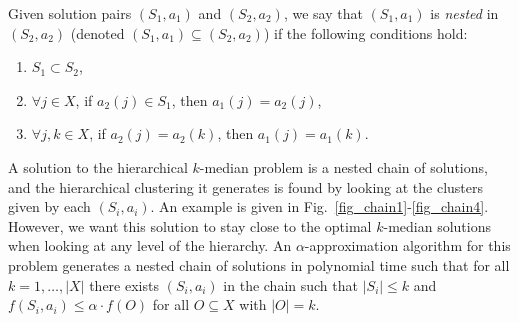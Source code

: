\documentclass[conference, 10pt, final]{IEEEtran}
\begin{document}
Given solution pairs $(S_1, a_1)$ and $(S_2, a_2)$, we say that $(S_1, a_1)$ is \emph{nested} in $(S_2, a_2)$ (denoted $(S_1, a_1) \subseteq (S_2, a_2)$) if the following conditions hold:
\begin{enumerate}[\IEEEsetlabelwidth{3)}]
	\item $S_1 \subset S_2$, 
	\item $\forall  j \in X$, if $a_2(j) \in S_1$, then $a_1(j) = a_2(j)$, 
	\item $\forall j, k \in X$, if $a_2(j) = a_2(k)$, then $a_1(j) = a_1(k)$.
\end{enumerate}
A solution to the hierarchical $k$-median problem is a nested chain of solutions, and the hierarchical clustering it generates is found by looking at the clusters given by each $(S_i, a_i)$. An example is given in Fig.~\ref{fig_chain1}-\ref{fig_chain4}. However, we want this solution to stay close to the optimal $k$-median solutions when looking at any level of the hierarchy. An $\alpha$-approximation algorithm for this problem generates a nested chain of solutions in polynomial time such that for all $k = 1, \ldots, |X|$ there exists $(S_i, a_i)$ in the chain such that $|S_i| \leq k$ and $f(S_i, a_i) \leq \alpha \cdot f(O)$ for all $O \subseteq X$ with $|O| = k$.
\end{document}
